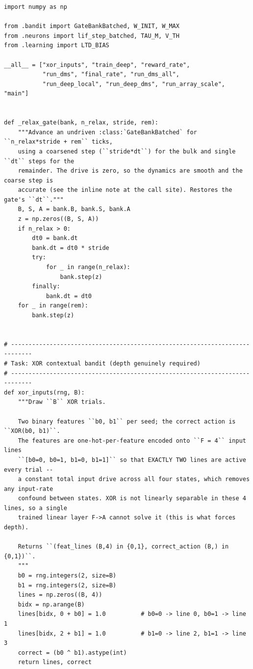 \begin{lstlisting}[caption={mrl\_trace/deep.py},label={lst:siox-src-deep}]
import numpy as np

from .bandit import GateBankBatched, W_INIT, W_MAX
from .neurons import lif_step_batched, TAU_M, V_TH
from .learning import LTD_BIAS

__all__ = ["xor_inputs", "train_deep", "reward_rate",
           "run_dms", "final_rate", "run_dms_all",
           "run_deep_local", "run_deep_dms", "run_array_scale", "main"]


def _relax_gate(bank, n_relax, stride, rem):
    """Advance an undriven :class:`GateBankBatched` for ``n_relax*stride + rem`` ticks,
    using a coarsened step (``stride*dt``) for the bulk and single ``dt`` steps for the
    remainder. The drive is zero, so the dynamics are smooth and the coarse step is
    accurate (see the inline note at the call site). Restores the gate's ``dt``."""
    B, S, A = bank.B, bank.S, bank.A
    z = np.zeros((B, S, A))
    if n_relax > 0:
        dt0 = bank.dt
        bank.dt = dt0 * stride
        try:
            for _ in range(n_relax):
                bank.step(z)
        finally:
            bank.dt = dt0
    for _ in range(rem):
        bank.step(z)


# ----------------------------------------------------------------------------
# Task: XOR contextual bandit (depth genuinely required)
# ----------------------------------------------------------------------------
def xor_inputs(rng, B):
    """Draw ``B`` XOR trials.

    Two binary features ``b0, b1`` per seed; the correct action is ``XOR(b0, b1)``.
    The features are one-hot-per-feature encoded onto ``F = 4`` input lines
    ``[b0=0, b0=1, b1=0, b1=1]`` so that EXACTLY TWO lines are active every trial --
    a constant total input drive across all four states, which removes any input-rate
    confound between states. XOR is not linearly separable in these 4 lines, so a single
    trained linear layer F->A cannot solve it (this is what forces depth).

    Returns ``(feat_lines (B,4) in {0,1}, correct_action (B,) in {0,1})``.
    """
    b0 = rng.integers(2, size=B)
    b1 = rng.integers(2, size=B)
    lines = np.zeros((B, 4))
    bidx = np.arange(B)
    lines[bidx, 0 + b0] = 1.0          # b0=0 -> line 0, b0=1 -> line 1
    lines[bidx, 2 + b1] = 1.0          # b1=0 -> line 2, b1=1 -> line 3
    correct = (b0 ^ b1).astype(int)
    return lines, correct



\end{lstlisting}
